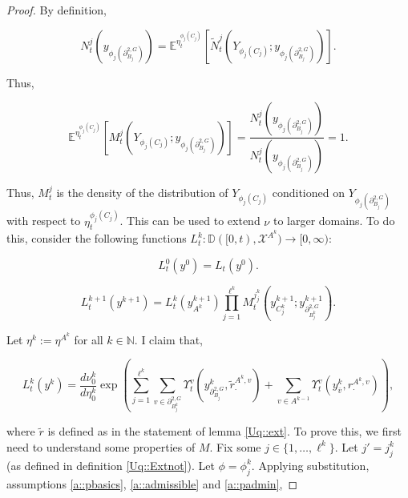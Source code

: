 \documentclass[12pt]{article}
\newcommand{\mb}{\mathbb}
\newcommand{\mc}{\mathcal}
\newcommand{\ra}{\rightarrow}
\newcommand{\ov}{\overline}
\newcommand{\exmu}[2]{\mb{E}^{#1}\left[#2\right]}	%
\newcommand{\defeq}{:=}								%
\newcommand{\cad}{\mb{D}}							%
\newcommand{\sta}{\mc{X}}							%
\newcommand{\dgneigh}[2]{\partial^{2,#1}_{#2}}		%
\newcommand{\cl}[1]{\ov{#1}}						%
\newcommand{\indx}[1]{^{#1}}						%
\newcommand{\rate}{r}								%
\newcommand{\vind}[1]{_{#1}}						%
\newcommand{\vpara}[1]{^{#1}}						%
\newcommand{\stpara}[1]{_{#1}}						%
\newcommand{\tpara}[1]{_{#1}}						%
\newcommand{\gvpara}[2]{^{#1,#2}}					%
\newcommand{\psize}{\ell}							%
\newcommand{\Xg}{Y}									%
\newcommand{\brate}{\alt{\rate}}					%
\newcommand{\alt}[1]{\tilde{#1}}					%
\newcommand{\mm}{\nu}								%
\newcommand{\mmm}{\eta}								%
\newcommand{\ds}{\Upsilon}							%
\newcommand{\dense}{L}								%
\newcommand{\densen}{N}								%
\newcommand{\denseph}{\alt{N}}						%
\newcommand{\mdense}{M}								%
\newcommand{\xg}{y}									%
\newcommand{\jpara}[1]{^{#1}}						%
\begin{document}
\begin{proof}
By definition, 

\[\densen\jpara{j}\tpara{t}(\xg\vind{\phi_j(\dgneigh{G}{B_j})}) = \exmu{\mmm\vpara{\phi_j(C_j)}\tpara{t}}{\denseph\jpara{j}\tpara{t}(\Xg\vind{\phi_j(C_j)};\xg\vind{\phi_j(\dgneigh{G}{B_j})})}.\]

Thus,

\[\exmu{\mmm\vpara{\phi_j(C_j)}\tpara{t}}{\mdense\jpara{j}\tpara{t}(\Xg\vind{\phi_j(C_j)};\xg\vind{\phi_j(\dgneigh{G}{B_j})})} = \frac{\densen\jpara{j}\tpara{t}(\xg\vind{\phi_j(\dgneigh{G}{B_j})})}{\densen\jpara{j}\tpara{t}(\xg\vind{\phi_j(\dgneigh{G}{B_j})})} = 1.\]

Thus, \(\mdense\jpara{j}\tpara{t}\) is the density of the distribution of \(\Xg\vind{\phi_j(C_j)}\) conditioned on \(\Xg\vind{\phi_j(\dgneigh{G}{B_j})}\) with respect to \(\mmm\vpara{\phi_j(C_j)}\tpara{t}\). This can be used to extend \(\mm\) to larger domains. To do this, consider the following functions \(\dense\indx{k}\tpara{t}: \cad([0,t),\sta^{A\indx{k}}) \ra [0,\infty)\):

\[\dense\indx{0}\tpara{t}(\xg\indx{0}) = \dense\tpara{t}(\xg\indx{0}).\]

\[\dense\indx{k+1}\tpara{t}(\xg\indx{k+1}) = \dense\indx{k}\tpara{t}(\xg\indx{k+1}\vind{A\indx{k}})\prod_{j=1}^{\psize\indx{k}}\mdense\jpara{j\indx{k}_j}\tpara{t}\left(\xg\indx{k+1}\vind{C_j\indx{k}};\xg\indx{k+1}\vind{\dgneigh{G}{B\indx{k}_j}}\right).\]

Let \(\mmm\indx{k} \defeq \mmm\vpara{A\indx{k}}\) for all \(k\in \mb{N}\). I claim that,

\[\dense\indx{k}\tpara{t}(\xg\indx{k}) = \frac{d\mm\indx{k}\tpara{0}}{d\mmm\indx{k}\tpara{0}}\exp\left(\sum_{j=1}^{\psize\indx{k}}\sum_{v\in \dgneigh{G}{B_j\indx{k}}} \ds\vpara{v}\tpara{t}\left(\xg\indx{k}\vind{\dgneigh{G}{B_j}},\brate\gvpara{A\indx{k}}{v}\stpara{\cdot}\right) + \sum_{v \in A\indx{k-1}} \ds\vpara{v}\tpara{t}\left(\xg\indx{k}\vind{\cl{v}},\rate\gvpara{A\indx{k}}{v}\stpara{\cdot}\right)\right),\]

where \(\brate\) is defined as in the statement of lemma \ref{Uq::ext}. To prove this, we first need to understand some properties of \(\mdense\). Fix some \(j \in \{1,\dots,\psize\indx{k}\}\). Let \(j' = j\indx{k}_j\) (as defined in definition \ref{Uq::Extnot}). Let \(\phi = \phi\indx{k}_j\). Applying substitution, assumptions \ref{a::pbasics}, \ref{a::admissible} and \ref{a::padmin},


\end{proof}
\end{document}
